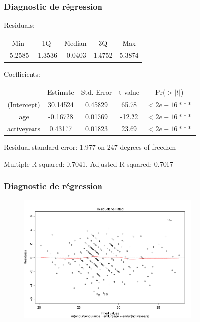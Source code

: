 \begin{frame}
\frametitle{Diagnostic de régression}

Residuals:
\begin{tabular}{ccccc}
    Min   &   1Q     & Median  &    3Q  &   Max \\
-5.2585   &  -1.3536 & -0.0403 & 1.4752 &  5.3874 \\
\end{tabular}

Coefficients:
\begin{tabular}{ccccc}
                 & Estimate &Std. Error &t value& Pr($>|t|$) \\
(Intercept)      & 30.14524 &   0.45829 &  65.78&   $<2e-16 ***$ \\
age              &-0.16728  &  0.01369  &-12.22 &   $<2e-16 ***$ \\
activeyears      &0.43177   & 0.01823   &23.69  &   $<2e-16 ***$  \\
\end{tabular}

Residual standard error: 1.977 on 247 degrees of freedom

Multiple R-squared:  0.7041,	Adjusted R-squared:  0.7017

\end{frame}




\begin{frame}
\frametitle{Diagnostic de régression}
\begin{figure}
  \centering
  \includegraphics[width=0.8\textwidth]{ResidualvsFitted}\\
\end{figure}
\end{frame}


